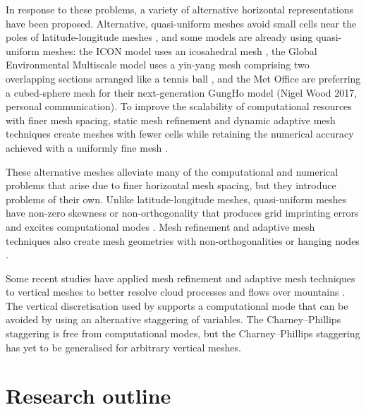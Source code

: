 In response to these problems, a variety of alternative horizontal representations have been proposed.
Alternative, quasi-uniform meshes avoid small cells near the poles of latitude-longitude meshes \citep{staniforth-thuburn2012}, and some models are already using quasi-uniform meshes: the ICON model uses an icosahedral mesh \citep{zaengl2015}, the Global Environmental Multiscale model uses a yin-yang mesh comprising two overlapping sections arranged like a tennis ball \citep{qaddouri-lee2011}, and the Met Office are preferring a cubed-sphere mesh for their next-generation GungHo model (Nigel Wood 2017, personal communication).
To improve the scalability of computational resources with finer mesh spacing, static mesh refinement and dynamic adaptive mesh techniques create meshes with fewer cells while retaining the numerical accuracy achieved with a uniformly fine mesh \citep{jablonowski2009}.

These alternative meshes alleviate many of the computational and numerical problems that arise due to finer horizontal mesh spacing, but they introduce problems of their own. 
Unlike latitude-longitude meshes, quasi-uniform meshes have non-zero skewness or non-orthogonality that produces grid imprinting errors and excites computational modes \citep{weller2012}.
Mesh refinement and adaptive mesh techniques also create mesh geometries with non-orthogonalities or hanging nodes \citep{marras2016}.

Some recent studies have applied mesh refinement and adaptive mesh techniques to vertical meshes to better resolve cloud processes \citep{mueller2013} and flows over mountains \citep{yamazaki-satomura2012}.  
The vertical discretisation used by \citet{yamazaki-satomura2012} supports a computational mode \citep{thuburn-woolings2005} that can be avoided by using an alternative staggering of variables.
The Charney--Phillips staggering is free from computational modes, but the Charney--Phillips staggering has yet to be generalised for arbitrary vertical meshes.

\section{Research outline}


